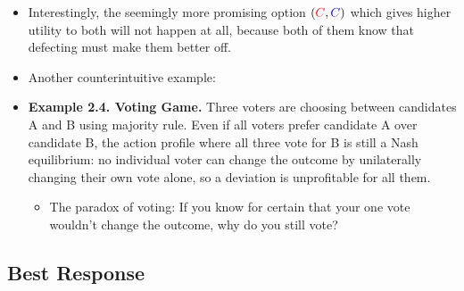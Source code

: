 \documentclass[notitlepage]{article}
\begin{document}
\begin{itemize}
    \item Interestingly, the seemingly more promising option \((\textcolor{red}{C}, \textcolor{blue}{C})\) which gives higher utility to both will not happen at all, because both of them know that defecting must make them better off.
    \item Another counterintuitive example:
    \item \textbf{Example 2.4. Voting Game.} Three voters are choosing between candidates A and B using majority rule. Even if all voters prefer candidate A over candidate B, the action profile where all three vote for B is still a Nash equilibrium: no individual voter can change the outcome by unilaterally changing their own vote alone, so a deviation is unprofitable for all them.
    \begin{itemize}
        \item The paradox of voting: If you know for certain that your one vote wouldn't change the outcome, why do you still vote?
    \end{itemize}
\end{itemize}

\subsection{Best Response}
\end{document}
